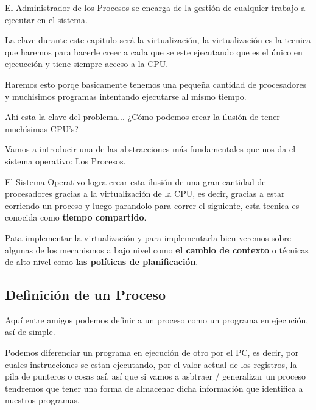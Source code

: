 \documentclass[12pt, fleqn]{report}                             %
\newcommand \Quote {\qq}                                        %
\begin{document}
                El Administrador de los Procesos se encarga de la gestión de cualquier trabajo
                a ejecutar en el sistema.

                La clave durante este capitulo será la virtualización, la virtualización es
                la tecnica que haremos para hacerle creer a cada \Quote{programa} que se este
                ejecutando que es el único en ejecucción y tiene siempre acceso a la CPU.


                Haremos esto porqe basicamente tenemos una pequeña cantidad de procesadores y 
                muchisimos programas intentando ejecutarse al mismo tiempo.

                Ahí esta la clave del problema... ¿Cómo podemos crear la ilusión de tener
                muchísimas CPU's?

                Vamos a introducir una de las abstracciones más fundamentales que nos da el 
                sistema operativo: Los Procesos.

                El Sistema Operativo logra crear esta ilusión de una gran cantidad de procesadores
                gracias a la virtualización de la CPU, es decir, gracias a estar corriendo un proceso
                y luego parandolo para correr el siguiente, esta tecnica es conocida como \textbf{
                tiempo compartido}.

                Pata implementar la virtualización y para implementarla bien veremos sobre algunas
                de los mecanismos a bajo nivel como \textbf{el cambio de contexto} o técnicas de 
                alto nivel como \textbf{las políticas de planificación}.

            \clearpage
            \subsection{Definición de un Proceso}

                Aquí entre amigos podemos definir a un proceso como un programa en ejecución,
                así de simple.

                Podemos diferenciar un programa en ejecución de otro por el PC, es decir, 
                por cuales instrucciones se estan ejecutando, por el valor actual de los registros,
                la pila de punteros o cosas así, así que si vamos a asbtraer / generalizar un proceso
                tendremos que tener una forma de almacenar dicha información que identifica a nuestros
                programas.
\end{document}
